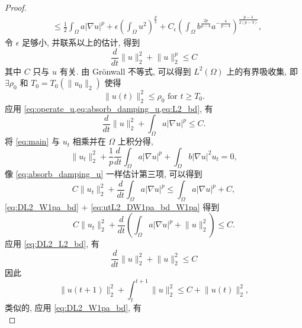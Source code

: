 \documentclass[oneside,longtitle]{LZUthesis}
\theoremstyle{definition}
\numberwithin{equation}{chapter}
\newcommand*\abs[1]{\lvert#1\rvert}
\newcommand*\norm[1]{\lVert#1\rVert}
\begin{document}
\begin{proof}
\begin{equation}
\begin{split}
			&\leq \frac{1}{2}\int_{\Omega}a\abs{\nabla u}^p
			+ \epsilon \left(\int_{\Omega}u^2\right)^{\frac{p}{2}}
			+ C_{\epsilon}\left(\int_{\Omega}b^{\frac{2p}{p-4}}a^{-\frac{4}{p-4}}\right)^{\frac{p-4}{2(p-3)}},
		\end{split}
	\end{equation}
	令 $\epsilon$ 足够小, 并联系以上的估计, 得到
	\begin{equation}\label{eq:DL2_L2_bd}
		\frac{d}{dt}\norm{u}_2^2 + \norm{u}_2^p \leq C
	\end{equation}
	其中 $C$ 只与 $u$ 有关. 由 Gr\"onwall 不等式, 可以得到 $L^2(\Omega)$ 上的有界吸收集,
	即 $\exists \rho_0$ 和
	$T_0 = T_0(\norm{u_0}_2)$ 使得
	\begin{equation}\label{eq:L2_bd}
		\norm{u(t)}_2^2 \leq \rho_0 \text{ for } t \geq T_0.
	\end{equation}
	应用 \cref{eq:operate_u,eq:absorb_damping_u,eq:L2_bd}, 有
	\begin{equation}\label{eq:DL2_W1pa_bd}
		\frac{d}{dt}\norm{u}_2^2 + \int_{\Omega}a \abs{\nabla u}^p \leq C.
	\end{equation}
	将 \cref{eq:main} 与 $u_{t}$ 相乘并在 $\Omega$ 上积分得,
	\begin{equation}\label{eq:operate_ut}
		\norm{u_t}_2^2
		+ \frac{1}{p}\frac{d}{dt}\int_{\Omega}a \abs{\nabla u}^p
		+ \int_{\Omega}b \abs{\nabla u}^2 u_t
		= 0,
	\end{equation}
	像 \cref{eq:absorb_damping_u} 一样估计第三项, 可以得到
	\begin{equation}\label{eq:utL2_DW1pa_bd_W1pa}
		C\norm{u_t}_2^2
		+ \frac{d}{dt}\int_{\Omega}a \abs{\nabla u}^p
		\leq \int_{\Omega}a \abs{\nabla u}^p
		+ C,
	\end{equation}
	\cref{eq:DL2_W1pa_bd} $+$ \cref{eq:utL2_DW1pa_bd_W1pa} 得到
	\begin{equation}\label{eq:utL2_DW1pa_DL2}
		C\norm{u_t}_2^2
		+ \frac{d}{dt}\left(\int_{\Omega}a \abs{\nabla u}^p
		+ \norm{u}_2^2\right)
		\leq C.
	\end{equation}
	应用 \cref{eq:DL2_L2_bd}, 有
	\begin{equation}
		\frac{d}{dt}\norm{u}_2^2 + \norm{u}_2^2 \leq C
	\end{equation}
	因此
	\begin{equation}\label{eq:int_DL2_L2_bd}
		\norm{u(t+1)}_2^2
		+ \int_t^{t+1}\norm{u}_2^2
		\leq C + \norm{u(t)}_2^2,
	\end{equation}
	类似的, 应用 \cref{eq:DL2_W1pa_bd}, 有
	\begin{equation}\label{eq:int_DL2_W1pa_bd}

\end{equation}
\end{proof}
\end{document}

